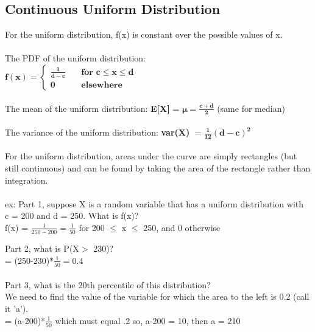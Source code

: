 \documentclass[12pt, a4paper]{article}
\begin{document}
	\subsection{Continuous Uniform Distribution}
	For the uniform distribution, f(x) is constant over the possible values of x. \\~\\
	The PDF of the uniform distribution: \\
	$ \mathbf{f(x) =
	\begin{cases}
	\frac{1}{d-c}   & \quad \textbf{for c$\leq$x$\leq$d}\\
	0	& \quad \textbf{elsewhere }
	\end{cases}}$ \\~\\
	The mean of the uniform distribution: \textbf{E[X]} = $\mathbf{\mu = \frac{c+d}{2}}$ (same for median) \\~\\
	The variance of the uniform distribution: \textbf{var(X)} $\mathbf{= \frac{1}{12}(d-c)^2}$ \\~\\
	For the uniform distribution, areas under the curve are simply rectangles (but still continuous) and can be found by taking the area of the rectangle rather than integration. \\~\\
	ex: Part 1, suppose X is a random variable that has a uniform distribution with \\ c = 200 and d = 250. What is f(x)? \\
	f(x) = $\frac{1}{250-200} = \frac{1}{50}$ for 200 $\leq$ x $\leq$ 250, and 0 otherwise \newpage
	
	\noindent Part 2, what is P(X$>$ 230)? \\
	= (250-230)*$\frac{1}{50} = 0.4$ \\~\\
	Part 3, what is the 20th percentile of this distribution? \\
	We need to find the value of the variable for which the area to the left is 0.2 (call it 'a'). \\
	= (a-200)*$\frac{1}{50}$ which must equal .2 so, a-200 = 10, then a = 210 \\~\\
	
\end{document}
